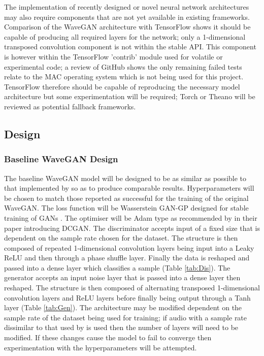 \documentclass[a4paper, dvipsnames, titlepage]{article}
\begin{document}
The implementation of recently designed or novel neural network architectures may also require components that are not yet available in existing frameworks.
Comparison of the WaveGAN architecture with TensorFlow shows it should be capable of producing all required layers for the network; only a 1-dimensional transposed convolution component is not within the stable API.
\newline
\newline
This component is however within the TensorFlow 'contrib' module used for volatile or experimental code; a review of GitHub shows the only remaining failed tests relate to the MAC operating system which is not being used for this project.
TensorFlow therefore should be capable of reproducing the necessary model architecture but some experimentation will be required; Torch or Theano will be reviewed as potential fallback frameworks.

\subsection{Design}

\subsubsection{Baseline WaveGAN Design}

The baseline WaveGAN model will be designed to be as similar as possible to that implemented by \citeauthor{2018arXiv180204208D} so as to produce comparable results.
Hyperparameters will be chosen to match those reported as successful for the training of the original WaveGAN.
The loss function will be Wasserstein GAN-GP designed for stable training of GANs \citep{2017arXiv170400028G}.
The optimiser will be Adam type as recommended by \citeauthor{2015arXiv151106434R} in their paper introducing DCGAN.
\newline
\newline
The discriminator accepts input of a fixed size that is dependent on the sample rate chosen for the dataset.
The structure is then composed of repeated 1-dimensional convolution layers being input into a Leaky ReLU and then through a phase shuffle layer.
Finally the data is reshaped and passed into a dense layer which classifies a sample (Table \ref{tab:Dis}).
\newline
\newline
The generator accepts an input noise layer that is passed into a dense layer then reshaped.
The structure is then composed of alternating transposed 1-dimensional convolution layers and ReLU layers before finally being output through a Tanh layer (Table \ref{tab:Gen}).
\newline
\newline
The architecture may be modified dependent on the sample rate of the dataset being used for training; if audio with a sample rate dissimilar to that used by \citeauthor{2018arXiv180204208D} is used then the number of layers will need to be modified.
If these changes cause the model to fail to converge then experimentation with the hyperparameters will be attempted.
\end{document}
